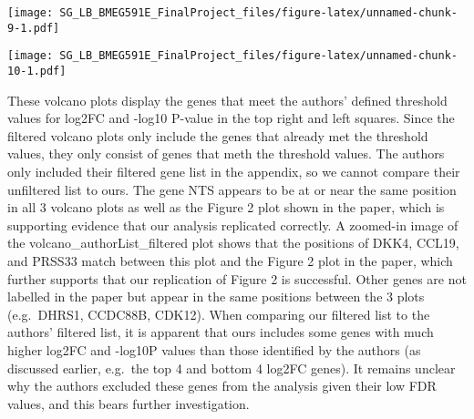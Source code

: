 \documentclass[
]{article}
\newenvironment{Shaded}{\begin{snugshade}}{\end{snugshade}}
\newcommand{\AttributeTok}[1]{\textcolor[rgb]{0.77,0.63,0.00}{#1}}
\newcommand{\CommentTok}[1]{\textcolor[rgb]{0.56,0.35,0.01}{\textit{#1}}}
\newcommand{\DecValTok}[1]{\textcolor[rgb]{0.00,0.00,0.81}{#1}}
\newcommand{\FloatTok}[1]{\textcolor[rgb]{0.00,0.00,0.81}{#1}}
\newcommand{\FunctionTok}[1]{\textcolor[rgb]{0.00,0.00,0.00}{#1}}
\newcommand{\NormalTok}[1]{#1}
\newcommand{\OtherTok}[1]{\textcolor[rgb]{0.56,0.35,0.01}{#1}}
\newcommand{\SpecialCharTok}[1]{\textcolor[rgb]{0.00,0.00,0.00}{#1}}
\newcommand{\StringTok}[1]{\textcolor[rgb]{0.31,0.60,0.02}{#1}}
\begin{document}
\texttt{[image: SG\_LB\_BMEG591E\_FinalProject\_files/figure-latex/unnamed-chunk-9-1.pdf]}

\begin{Shaded}
\end{Shaded}

\texttt{[image: SG\_LB\_BMEG591E\_FinalProject\_files/figure-latex/unnamed-chunk-10-1.pdf]}

These volcano plots display the genes that meet the authors' defined
threshold values for \textbar log2FC\textbar{} and -log10 P-value in the
top right and left squares. Since the filtered volcano plots only
include the genes that already met the threshold values, they only
consist of genes that meth the threshold values. The authors only
included their filtered gene list in the appendix, so we cannot compare
their unfiltered list to ours. The gene NTS appears to be at or near the
same position in all 3 volcano plots as well as the Figure 2 plot shown
in the paper, which is supporting evidence that our analysis replicated
correctly. A zoomed-in image of the volcano\_authorList\_filtered plot
shows that the positions of DKK4, CCL19, and PRSS33 match between this
plot and the Figure 2 plot in the paper, which further supports that our
replication of Figure 2 is successful. Other genes are not labelled in
the paper but appear in the same positions between the 3 plots
(e.g.~DHRS1, CCDC88B, CDK12). When comparing our filtered list to the
authors' filtered list, it is apparent that ours includes some genes
with much higher \textbar log2FC\textbar{} and -log10P values than those
identified by the authors (as discussed earlier, e.g.~the top 4 and
bottom 4 log2FC genes). It remains unclear why the authors excluded
these genes from the analysis given their low FDR values, and this bears
further investigation.
\end{document}
